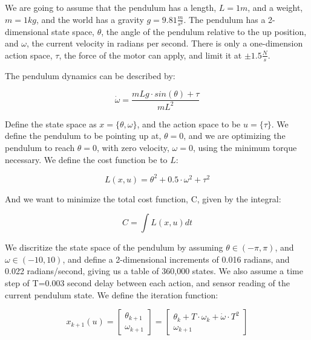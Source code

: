 \documentclass{article}
\begin{document}
We are going to assume that the pendulum has a length, $L=1m$, and a weight, $m=1kg$, and the world has a gravity $g=9.81\frac{m}{s^2}$. The pendulum has a 2-dimensional state space, $\theta$, the angle of the pendulum relative to the up position, and $\omega$, the current velocity in radians per second. There is only a one-dimension action space, $\tau$, the force of the motor can apply, and limit it at $\pm 1.5 \frac{N}{s}$.

The pendulum dynamics can be described by:

\begin{equation} 
\dot{\omega} = \frac{mLg \cdot sin(\theta) + \tau}{mL^2}
\end{equation}

Define the state space as $x=\{\theta, \omega\}$, and the action space to be $u=\{\tau\}$. We define the pendulum to be pointing up at, $\theta = 0$, and we are optimizing the pendulum to reach $\theta = 0$, with zero velocity, $\omega = 0$, using the minimum torque necessary. We define the cost function be to $L$:

\begin{equation} 
L(x,u) = \theta^2 + 0.5 \cdot \omega^2 + \tau^2
\end{equation}

And we want to minimize the total cost function, C, given by the integral: 

\begin{equation} 
C = \int L(x,u) dt
\end{equation}

We discritize the state space of the pendulum by assuming $\theta \in  (-\pi,\pi)$, and $\omega \in (-10,10)$, and define a 2-dimensional increments of 0.016 radians, and 0.022 radians/second, giving us a table of 360,000 states. We also assume a time step of T=0.003 second delay between each action, and sensor reading of the current pendulum state. We define the iteration function:

\begin{equation} 
x_{k+1}(u) = 
\begin{bmatrix}
\theta_{k+1} \\
\omega_{k+1}
\end{bmatrix}
=
\begin{bmatrix}
\theta_{k} + T \cdot \omega_{k} + \dot{\omega} \cdot T^2 \\
\omega_{k+1}
\end{bmatrix}
\end{equation}
\end{document}
